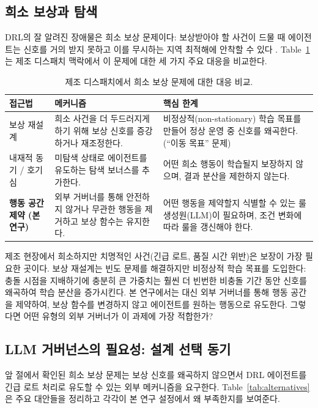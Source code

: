 \documentclass[10pt]{article}
\begin{document}
\subsection{희소 보상과 탐색}
DRL의 잘 알려진 장애물은 희소 보상 문제이다: 보상받아야 할 사건이 드물 때
에이전트는 신호를 거의 받지 못하고 이를 무시하는 지역 최적해에 안착할 수 있다
\cite{pathak2017}. Table~\ref{tab:sparse}는 제조 디스패치 맥락에서 이 문제에
대한 세 가지 주요 대응을 비교한다.

\begin{table}[thb]
\centering
\caption{제조 디스패치에서 희소 보상 문제에 대한 대응 비교.}
\label{tab:sparse}
\setlength{\tabcolsep}{4pt}
\begin{tabularx}{\columnwidth}{@{}p{2.1cm}XX@{}}
\hline
\textbf{접근법} & \textbf{메커니즘} & \textbf{핵심 한계} \\ \hline
보상 재설계~\cite{ng1999}
  & 희소 사건을 더 두드러지게 하기 위해 보상 신호를 증강하거나 재조정한다.
  & 비정상적(non-stationary) 학습 목표를 만들어 정상 운영 중 신호를 왜곡한다.
    (``이동 목표'' 문제) \\[2pt]
내재적 동기 / 호기심~\cite{pathak2017}
  & 미탐색 상태로 에이전트를 유도하는 탐색 보너스를 추가한다.
  & 어떤 희소 행동이 학습될지 보장하지 않으며, 결과 분산을 제한하지 않는다. \\[2pt]
\textbf{행동 공간 제약 (본 연구)}
  & 외부 거버너를 통해 안전하지 않거나 무관한 행동을 제거하고 보상 함수는 유지한다.
  & 어떤 행동을 제약할지 식별할 수 있는 룰 생성원(LLM)이 필요하며,
    조건 변화에 따라 룰을 갱신해야 한다. \\ \hline
\end{tabularx}
\end{table}

제조 현장에서 희소하지만 치명적인 사건(긴급 로트, 품질 시간 위반)은 보장이
가장 필요한 곳이다. 보상 재설계는 빈도 문제를 해결하지만 비정상적 학습 목표를
도입한다: 충돌 시점을 지배하기에 충분히 큰 가중치는 훨씬 더 빈번한 비충돌 기간
동안 신호를 왜곡하여 학습 분산을 증가시킨다. 본 연구에서는 대신 외부 거버너를
통해 행동 공간을 제약하여, 보상 함수를 변경하지 않고 에이전트를 원하는 행동으로
유도한다. 그렇다면 어떤 유형의 외부 거버너가 이 과제에 가장 적합한가?

\subsection{LLM 거버넌스의 필요성: 설계 선택 동기}
\label{sec:alternatives}

앞 절에서 확인된 희소 보상 문제는 보상 신호를 왜곡하지 않으면서 DRL 에이전트를
긴급 로트 처리로 유도할 수 있는 외부 메커니즘을 요구한다.
Table~\ref{tab:alternatives}은 주요 대안들을 정리하고 각각이 본 연구 설정에서
왜 부족한지를 보여준다.
\end{document}
